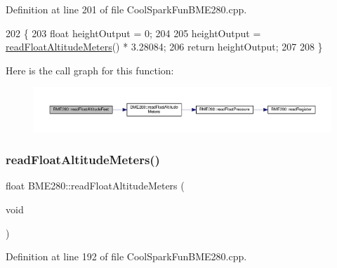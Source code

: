 Definition at line 201 of file Cool\+Spark\+Fun\+B\+M\+E280.\+cpp.


\begin{DoxyCode}
202 \{
203     \textcolor{keywordtype}{float} heightOutput = 0;
204     
205     heightOutput = \hyperlink{class_b_m_e280_af67b56ba50760ee1d116acc6c5010221}{readFloatAltitudeMeters}() * 3.28084;
206     \textcolor{keywordflow}{return} heightOutput;
207     
208 \}
\end{DoxyCode}
Here is the call graph for this function\+:\nopagebreak
\begin{figure}[H]
\begin{center}
\leavevmode
\includegraphics[width=350pt]{df/dcf/class_b_m_e280_a6525c8a26f887b52596c86bed99343cb_cgraph}
\end{center}
\end{figure}
\mbox{\label{class_b_m_e280_af67b56ba50760ee1d116acc6c5010221}} 
\subsubsection{\texorpdfstring{read\+Float\+Altitude\+Meters()}{readFloatAltitudeMeters()}}
{\footnotesize\ttfamily float B\+M\+E280\+::read\+Float\+Altitude\+Meters (\begin{DoxyParamCaption}\item[{void}]{ }\end{DoxyParamCaption})}



Definition at line 192 of file Cool\+Spark\+Fun\+B\+M\+E280.\+cpp.


